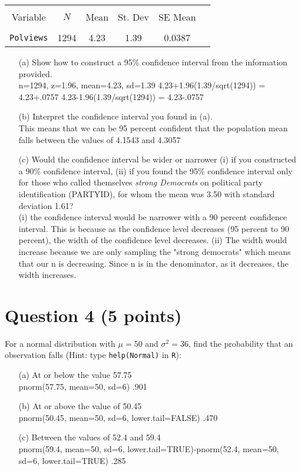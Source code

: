 \documentclass[12pt,letterpaper]{article}
\begin{document}
\begin{table}[H]
\centering
\begin{tabular}{cccccc}
\hline \\[-1.8ex]
Variable & $N$ & Mean  & St. Dev & SE Mean \\ 
\hline \\[-1.8ex]
\texttt{Polviews} & 1294 & 4.23  & 1.39 & 0.0387 \\ 
\hline
\end{tabular} 
\end{table}

\begin{itemize}

\item[(a)] Show how to construct a 95\% confidence interval from the information provided.\\
n=1294, z=1.96, mean=4.23, sd=1.39
4.23+1.96(1.39/sqrt(1294)) = 4.23+.0757
4.23-1.96(1.39/sqrt(1294)) = 4.23-.0757
\item[(b)] Interpret the confidence interval you found in (a).\\
This means that we can be 95 percent confident that the population mean falls between the values of 4.1543 and 4.3057

\item[(c)] Would the confidence interval be wider or narrower (i) if you constructed a 90\% confidence interval, (ii) if you found the 95\% confidence interval only for those who called themselves \textit{strong Democrats} on political party identification (PARTYID), for whom the mean was 3.50 with standard deviation 1.61?\\
(i) the confidence interval would be narrower with a 90 percent confidence interval. This is because as the confidence level decreases (95 percent to 90 percent), the width of the confidence level decreases.
(ii) The width would increase because we are only sampling the "strong democrats" which means that our n is decreasing. Since n is in the denominator, as it decreases, the width increases.
\end{itemize}

\section*{Question 4 (5 points)}
For a normal distribution with $\mu = 50$ and $\sigma^2 = 36$, find the probability that an observation falls (Hint: type \texttt{help(Normal)} in \texttt{R}):

\begin{itemize}
\item[(a)] At or below the value 57.75 \\
pnorm(57.75, mean=50, sd=6)
.901
\item[(b)] At or above the value of  50.45 \\
pnorm(50.45, mean=50, sd=6, lower.tail=FALSE)
.470
\item[(c)] Between the values of 52.4 and 59.4 \\
pnorm(59.4, mean=50, sd=6, lower.tail=TRUE)-pnorm(52.4, mean=50, sd=6, lower.tail=TRUE)
.285

\end{itemize}
\end{document}
